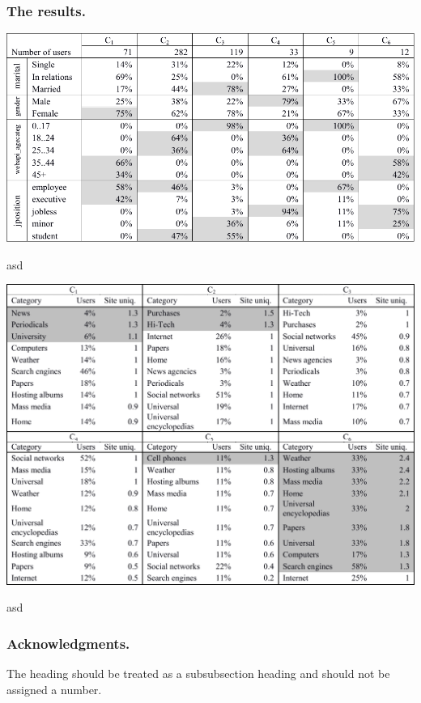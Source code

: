 \documentclass[runningheads,a4paper]{llncs}
\begin{document}
\subsubsection{The results.}



\begin{table}\label{OWoti}
	\includegraphics[width=\linewidth]{t1.pdf}
	
	\caption{asd}
\end{table}



\begin{table}\label{01Yti}
	\includegraphics[width=\linewidth]{t2.pdf}
	
	\caption{asd}
\end{table}





\subsubsection*{Acknowledgments.} The heading should be treated as a
subsubsection heading and should not be assigned a number.
\end{document}
